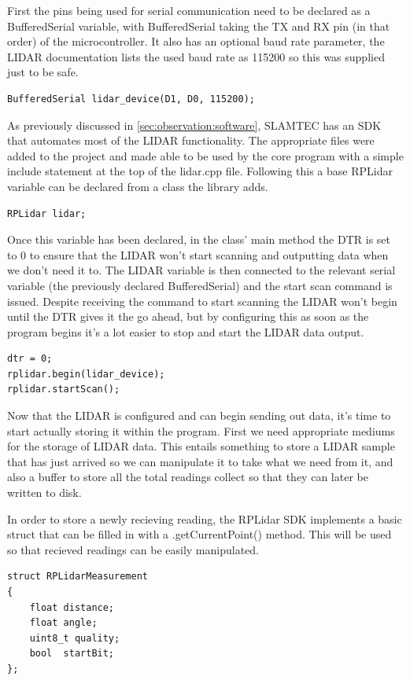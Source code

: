 				First the pins being used for serial communication need to be declared as a BufferedSerial variable, with BufferedSerial taking the TX and RX pin (in that order) of the microcontroller. It also has an optional baud rate parameter, the LIDAR documentation lists the used baud rate as 115200 so this was supplied just to be safe.
				\begin{lstlisting}
BufferedSerial lidar_device(D1, D0, 115200);
				\end{lstlisting}
				
				As previously discussed in \ref{sec:observation:software}, SLAMTEC has an SDK that automates most of the LIDAR functionality. The appropriate files were added to the project and made able to be used by the core program with a simple include statement at the top of the lidar.cpp file.
				Following this a base RPLidar variable can be declared from a class the library adds.
				\begin{lstlisting}
RPLidar lidar;
				\end{lstlisting}
				
				Once this variable has been declared, in the class' main method the DTR is set to 0 to ensure that the LIDAR won't start scanning and outputting data when we don't need it to. The LIDAR variable is then connected to the relevant serial variable (the previously declared BufferedSerial) and the start scan command is issued. Despite receiving the command to start scanning the LIDAR won't begin until the DTR gives it the go ahead, but by configuring this as soon as the program begins it's a lot easier to stop and start the LIDAR data output.
				\begin{lstlisting}
dtr = 0;
rplidar.begin(lidar_device);
rplidar.startScan();
				\end{lstlisting}
				
				Now that the LIDAR is configured and can begin sending out data, it's time to start actually storing it within the program. First we need appropriate mediums for the storage of LIDAR data. This entails something to store a LIDAR sample that has just arrived so we can manipulate it to take what we need from it, and also a buffer to store all the total readings collect so that they can later be written to disk. 
				
				In order to store a newly recieving reading, the RPLidar SDK implements a basic struct that can be filled in with a .getCurrentPoint() method. This will be used so that recieved readings can be easily manipulated.
				\begin{lstlisting}
struct RPLidarMeasurement
{
	float distance;
	float angle;
	uint8_t quality;
	bool  startBit;
};
				\end{lstlisting}
				
